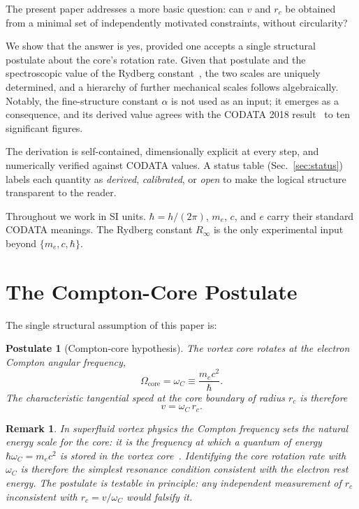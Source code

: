 \documentclass[aps,pra,preprint,longbibliography,nofootinbib]{revtex4-2}
\newtheorem{postulate}{Postulate}
\newtheorem{remark}{Remark}
\newcommand{\vc}{v}              %
\newcommand{\rc}{r_c}            %
\newcommand{\omC}{\omega_C}      %
\newcommand{\Rinf}{R_\infty}     %
\begin{document}
The present paper addresses a more basic question: can $\vc$ and $\rc$
be obtained from a minimal set of independently motivated constraints,
without circularity?

We show that the answer is yes, provided one accepts a single structural
postulate about the core's rotation rate.
Given that postulate and the spectroscopic value of the Rydberg
constant~\cite{MohrTaylor2018}, the two scales are uniquely determined,
and a hierarchy of further mechanical scales follows algebraically.
Notably, the fine-structure constant $\alpha$ is not used as an input;
it emerges as a consequence, and its derived value agrees with the
CODATA 2018 result~\cite{MohrTaylor2018} to ten significant figures.

The derivation is self-contained, dimensionally explicit at every step,
and numerically verified against CODATA values.
A status table (Sec.~\ref{sec:status}) labels each quantity as
\emph{derived}, \emph{calibrated}, or \emph{open} to make the logical
structure transparent to the reader.

Throughout we work in SI units.
$\hbar = h/(2\pi)$, $m_e$, $c$, and $e$ carry their standard CODATA
meanings.
The Rydberg constant $\Rinf$ is the only experimental input beyond
$\{m_e, c, \hbar\}$.

\section{The Compton-Core Postulate}
\label{sec:postulate}

The single structural assumption of this paper is:

\begin{postulate}[Compton-core hypothesis]
\label{post:compton}
The vortex core rotates at the electron Compton angular frequency,
\begin{equation}
  \Omega_{\mathrm{core}} = \omC \equiv \frac{m_e c^2}{\hbar}.
  \label{eq:postulate}
\end{equation}
The characteristic tangential speed at the core boundary of radius
$\rc$ is therefore
\begin{equation}
  \vc = \omC\,\rc.
  \label{eq:vc_rc_link}
\end{equation}
\end{postulate}

\begin{remark}
\label{rem:motivation}
In superfluid vortex physics the Compton frequency sets the natural
energy scale for the core: it is the frequency at which a quantum of
energy $\hbar\omC = m_e c^2$ is stored in the vortex
core~\cite{Donnelly1991,Pethick2008}.
Identifying the core rotation rate with $\omC$ is therefore the
simplest resonance condition consistent with the electron rest energy.
The postulate is testable in principle: any independent measurement
of $\rc$ inconsistent with $\rc = \vc/\omC$ would falsify it.
\end{remark}
\end{document}
